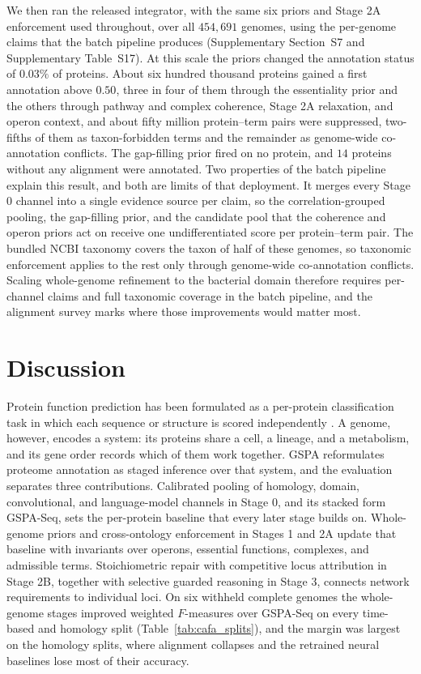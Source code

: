 \documentclass[10pt,twocolumn]{article}
\begin{document}
We then ran the released integrator, with the same six priors and Stage 2A enforcement used throughout, over all $454{,}691$ genomes, using the per-genome claims that the batch pipeline produces (Supplementary Section~S7 and Supplementary Table~S17). At this scale the priors changed the annotation status of $0.03\%$ of proteins. About six hundred thousand proteins gained a first annotation above $0.50$, three in four of them through the essentiality prior and the others through pathway and complex coherence, Stage 2A relaxation, and operon context, and about fifty million protein--term pairs were suppressed, two-fifths of them as taxon-forbidden terms and the remainder as genome-wide co-annotation conflicts. The gap-filling prior fired on no protein, and $14$ proteins without any alignment were annotated. Two properties of the batch pipeline explain this result, and both are limits of that deployment. It merges every Stage 0 channel into a single evidence source per claim, so the correlation-grouped pooling, the gap-filling prior, and the candidate pool that the coherence and operon priors act on receive one undifferentiated score per protein--term pair. The bundled NCBI taxonomy covers the taxon of half of these genomes, so taxonomic enforcement applies to the rest only through genome-wide co-annotation conflicts. Scaling whole-genome refinement to the bacterial domain therefore requires per-channel claims and full taxonomic coverage in the batch pipeline, and the alignment survey marks where those improvements would matter most.

\section{Discussion}

Protein function prediction has been formulated as a per-protein classification task in which each sequence or structure is scored independently \citep{radivojac2013large,gligorijevic2021structure,you2021deepgraphgo,cao2021tale,yuan2023fast,kulmanov2024deepgose,ding2025dpfunc}. A genome, however, encodes a system: its proteins share a cell, a lineage, and a metabolism, and its gene order records which of them work together. GSPA reformulates proteome annotation as staged inference over that system, and the evaluation separates three contributions. Calibrated pooling of homology, domain, convolutional, and language-model channels in Stage 0, and its stacked form GSPA-Seq, sets the per-protein baseline that every later stage builds on. Whole-genome priors and cross-ontology enforcement in Stages 1 and 2A update that baseline with invariants over operons, essential functions, complexes, and admissible terms. Stoichiometric repair with competitive locus attribution in Stage 2B, together with selective guarded reasoning in Stage 3, connects network requirements to individual loci. On six withheld complete genomes the whole-genome stages improved weighted $F$-measures over GSPA-Seq on every time-based and homology split (Table~\ref{tab:cafa_splits}), and the margin was largest on the homology splits, where alignment collapses and the retrained neural baselines lose most of their accuracy.
\end{document}

